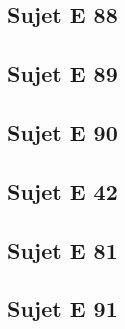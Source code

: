 \subsection*{Sujet E 88}





\subsection*{Sujet E 89}





\subsection*{Sujet E 90}



\subsection*{Sujet E 42}





\subsection*{Sujet E 81}





\subsection*{Sujet E 91}

